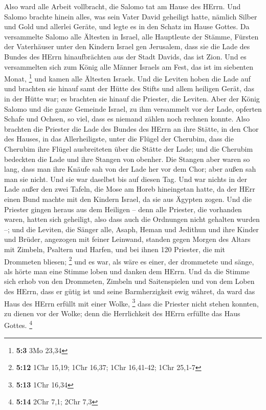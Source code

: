  Also ward alle Arbeit vollbracht, die Salomo tat am Hause
des HErrn. Und Salomo brachte hinein alles, was sein Vater David
geheiligt hatte, nämlich Silber und Gold und allerlei Geräte, und legte
es in den Schatz im Hause Gottes.  Da versammelte Salomo
alle Ältesten in Israel, alle Hauptleute der Stämme, Fürsten der
Vaterhäuser unter den Kindern Israel gen Jerusalem, dass sie die Lade
des Bundes des HErrn hinaufbrächten aus der Stadt Davids, das ist Zion.
 Und es versammelten sich zum König alle Männer Israels am
Fest, das ist im siebenten Monat, \footnote{\textbf{5:3} 3Mo 23,34}
 und kamen alle Ältesten Israels. Und die Leviten hoben
die Lade auf  und brachten sie hinauf samt der Hütte des
Stifts und allem heiligen Gerät, das in der Hütte war; es brachten sie
hinauf die Priester, die Leviten.  Aber der König Salomo
und die ganze Gemeinde Israel, zu ihm versammelt vor der Lade, opferten
Schafe und Ochsen, so viel, dass es niemand zählen noch rechnen konnte.
 Also brachten die Priester die Lade des Bundes des HErrn
an ihre Stätte, in den Chor des Hauses, in das Allerheiligste, unter die
Flügel der Cherubim,  dass die Cherubim ihre Flügel
ausbreiteten über die Stätte der Lade; und die Cherubim bedeckten die
Lade und ihre Stangen von obenher.  Die Stangen aber waren
so lang, dass man ihre Knäufe sah von der Lade her vor dem Chor; aber
außen sah man sie nicht. Und sie war daselbst bis auf diesen Tag.
 Und war nichts in der Lade außer den zwei Tafeln, die
Mose am Horeb hineingetan hatte, da der HErr einen Bund machte mit den
Kindern Israel, da sie aus Ägypten zogen.  Und die
Priester gingen heraus aus dem Heiligen -- denn alle Priester, die
vorhanden waren, hatten sich geheiligt, also dass auch die Ordnungen
nicht gehalten wurden --;  und die Leviten, die Sänger
alle, Asaph, Heman und Jedithun und ihre Kinder und Brüder, angezogen
mit feiner Leinwand, standen gegen Morgen des Altars mit Zimbeln,
Psaltern und Harfen, und bei ihnen 120 Priester, die mit Drommeten
bliesen; \footnote{\textbf{5:12} 1Chr 15,19; 1Chr 16,37; 1Chr 16,41-42;
  1Chr 25,1-7}  und es war, als wäre es einer, der
drommetete und sänge, als hörte man eine Stimme loben und danken dem
HErrn. Und da die Stimme sich erhob von den Drommeten, Zimbeln und
Saitenspielen und von dem Loben des HErrn, dass er gütig ist und seine
Barmherzigkeit ewig währet, da ward das Haus des HErrn erfüllt mit einer
Wolke, \footnote{\textbf{5:13} 1Chr 16,34}  dass die
Priester nicht stehen konnten, zu dienen vor der Wolke; denn die
Herrlichkeit des HErrn erfüllte das Haus Gottes. \footnote{\textbf{5:14}
  2Chr 7,1; 2Chr 7,3}

